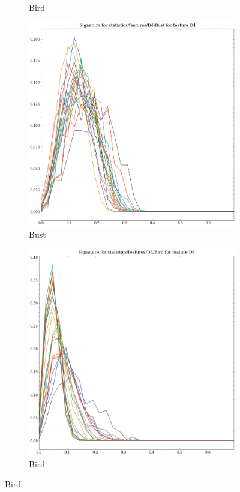 \begin{figure}[t!p]
\begin{subfigure}[b]{0.23\textwidth}
        \caption{Bird}
    \end{subfigure}
    \hfill
    \begin{subfigure}[b]{0.23\textwidth}
        \includegraphics[width=\textwidth]{assets/feature_extraction/D4/Bust.png}
        \caption{Bust}
    \end{subfigure}
    \hfill
    \begin{subfigure}[b]{0.23\textwidth}
        \includegraphics[width=\textwidth]{assets/feature_extraction/D4/Bird.png}
        \caption{Bird}
        \label{fig:features-statistics-D4-h}    
    \end{subfigure}
    \hfill


\end{figure}
